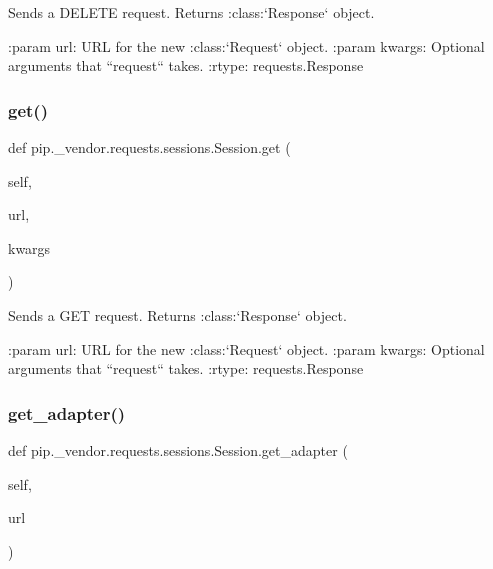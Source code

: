 \begin{DoxyVerb}Sends a DELETE request. Returns :class:`Response` object.

:param url: URL for the new :class:`Request` object.
:param \*\*kwargs: Optional arguments that ``request`` takes.
:rtype: requests.Response
\end{DoxyVerb}
 \mbox{\label{classpip_1_1__vendor_1_1requests_1_1sessions_1_1Session_adf546460280c8f2ff702345867d50f5f}} 
\subsubsection{\texorpdfstring{get()}{get()}}
{\footnotesize\ttfamily def pip.\+\_\+vendor.\+requests.\+sessions.\+Session.\+get (\begin{DoxyParamCaption}\item[{}]{self,  }\item[{}]{url,  }\item[{}]{kwargs }\end{DoxyParamCaption})}

\begin{DoxyVerb}Sends a GET request. Returns :class:`Response` object.

:param url: URL for the new :class:`Request` object.
:param \*\*kwargs: Optional arguments that ``request`` takes.
:rtype: requests.Response
\end{DoxyVerb}
 \mbox{\label{classpip_1_1__vendor_1_1requests_1_1sessions_1_1Session_a47e674b4322882dfd81238166e13eedf}} 
\subsubsection{\texorpdfstring{get\+\_\+adapter()}{get\_adapter()}}
{\footnotesize\ttfamily def pip.\+\_\+vendor.\+requests.\+sessions.\+Session.\+get\+\_\+adapter (\begin{DoxyParamCaption}\item[{}]{self,  }\item[{}]{url }\end{DoxyParamCaption})}

